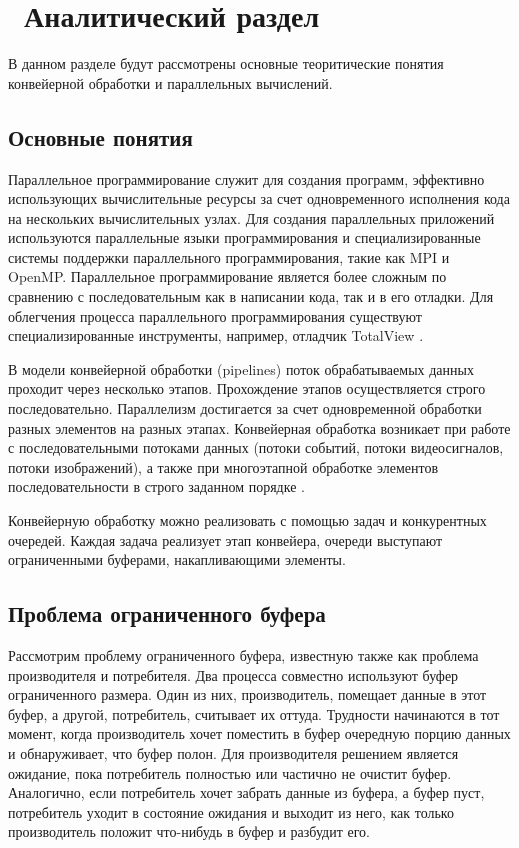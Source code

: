 \chapter{ Аналитический раздел}
\label{cha:analytical}
    В данном разделе будут рассмотрены основные теоритические понятия конвейерной обработки и параллельных вычислений.

    \section{Основные понятия}
        Параллельное программирование служит для создания программ,
        эффективно использующих вычислительные ресурсы за счет одновременного
        исполнения кода на нескольких вычислительных узлах.
        Для создания параллельных приложений используются параллельные языки
        программирования и специализированные системы поддержки параллельного
        программирования, такие как MPI и OpenMP. 
        Параллельное программирование является более сложным по сравнению
        с последовательным как в написании кода, так и в его отладки.
        Для облегчения процесса параллельного программирования существуют
        специализированные инструменты, например, отладчик TotalView \cite{totalview}.

        В модели конвейерной обработки (pipelines) поток обрабатываемых данных проходит через несколько этапов.
        Прохождение этапов осуществляется строго последовательно. 
        Параллелизм достигается за счет одновременной обработки разных элементов на разных этапах.
        Конвейерная обработка возникает при работе с последовательными потоками данных 
        (потоки событий, потоки видеосигналов, потоки изображений), 
        а также при многоэтапной обработке элементов последовательности в строго заданном порядке \cite{typical-models-parallel-applications}.

        Конвейерную обработку можно реализовать с помощью задач и конкурентных очередей.
        Каждая задача реализует этап конвейера, очереди выступают ограниченными буферами,
        накапливающими элементы.

    \section{Проблема ограниченного буфера}
        Рассмотрим проблему ограниченного буфера, известную также как проблема производителя и потребителя.
        Два процесса совместно используют буфер ограниченного размера.
        Один из них, производитель, помещает данные в этот буфер,
        а другой, потребитель, считывает их оттуда.
        Трудности начинаются в тот момент, когда производитель хочет поместить
        в буфер очередную порцию данных и обнаруживает, что буфер полон.
        Для производителя решением является ожидание,
        пока потребитель полностью или частично не очистит буфер.
        Аналогично, если потребитель хочет забрать данные из буфера,
        а буфер пуст, потребитель уходит в состояние ожидания и выходит из него,
        как только производитель положит что-нибудь в буфер и разбудит его.

